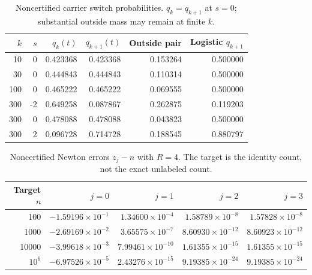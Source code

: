 \documentclass[11pt]{article}
\theoremstyle{remark}\newtheorem{remark}[theorem]{Remark}
\begin{document}
\begin{table}[htbp]\centering\small
\caption{Noncertified carrier switch probabilities. $q_k=q_{k+1}$ at $s=0$; substantial outside mass may remain at finite $k$.}\label{mis:tab:switch}
\begin{tabular}{r r r r r r}\toprule
$k$ & $s$ & $q_k(t)$ & $q_{k+1}(t)$ & Outside pair & Logistic $q_{k+1}$ \\ \midrule
10 & 0 & 0.423368 & 0.423368 & 0.153264 & 0.500000 \\
30 & 0 & 0.444843 & 0.444843 & 0.110314 & 0.500000 \\
100 & 0 & 0.465222 & 0.465222 & 0.069555 & 0.500000 \\
300 & -2 & 0.649258 & 0.087867 & 0.262875 & 0.119203 \\
300 & 0 & 0.478088 & 0.478088 & 0.043823 & 0.500000 \\
300 & 2 & 0.096728 & 0.714728 & 0.188545 & 0.880797 \\
\bottomrule\end{tabular}\end{table}
\begin{table}[htbp]\centering\small
\caption{Noncertified Newton errors $z_j-n$ with $R=4$. The target is the identity count, not the exact unlabeled count.}\label{mis:tab:inverse}
\begin{tabular}{r r r r r}\toprule
Target $n$ & $j=0$ & $j=1$ & $j=2$ & $j=3$ \\ \midrule
100 & $-1.59196\times10^{-1}$ & $1.34600\times10^{-4}$ & $1.58789\times10^{-8}$ & $1.57828\times10^{-8}$ \\
1000 & $-2.69169\times10^{-2}$ & $3.65575\times10^{-7}$ & $8.60930\times10^{-12}$ & $8.60923\times10^{-12}$ \\
10000 & $-3.99618\times10^{-3}$ & $7.99461\times10^{-10}$ & $1.61355\times10^{-15}$ & $1.61355\times10^{-15}$ \\
$10^6$ & $-6.97526\times10^{-5}$ & $2.43276\times10^{-15}$ & $9.19385\times10^{-24}$ & $9.19385\times10^{-24}$ \\
\bottomrule\end{tabular}\end{table}
\clearpage
\end{document}
